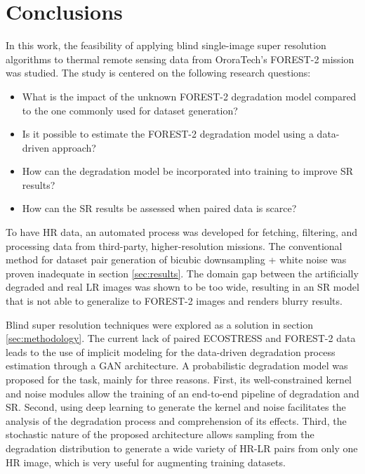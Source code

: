 \section{Conclusions}

In this work, the feasibility of applying blind single-image super resolution algorithms to thermal remote sensing data from OroraTech’s FOREST-2 mission was studied. The study is centered on the following research questions:

\begin{itemize}
    \item What is the impact of the unknown FOREST-2 degradation model compared to the one commonly used for dataset generation?
    \item Is it possible to estimate the FOREST-2 degradation model using a data-driven approach?
    \item How can the degradation model be incorporated into training to improve SR results?
    \item  How can the SR results be assessed when paired data is scarce?
\end{itemize}

To have HR data, an automated process was developed for fetching, filtering, and processing data from third-party, higher-resolution missions. The conventional method for dataset pair generation of bicubic downsampling + white noise was proven inadequate in section \ref{sec:results}. The domain gap between the artificially degraded and real LR images was shown to be too wide, resulting in an SR model that is not able to generalize to FOREST-2 images and renders blurry results.

Blind super resolution techniques were explored as a solution in section \ref{sec:methodology}. The current lack of paired ECOSTRESS and FOREST-2 data leads to the use of implicit modeling for the data-driven degradation process estimation through a GAN architecture. A probabilistic degradation model was proposed for the task, mainly for three reasons. First, its well-constrained kernel and noise modules allow the training of an end-to-end pipeline of degradation and SR. Second, using deep learning to generate the kernel and noise facilitates the analysis of the degradation process and comprehension of its effects. Third, the stochastic nature of the proposed architecture allows sampling from the degradation distribution to generate a wide variety of HR-LR pairs from only one HR image, which is very useful for augmenting training datasets.

